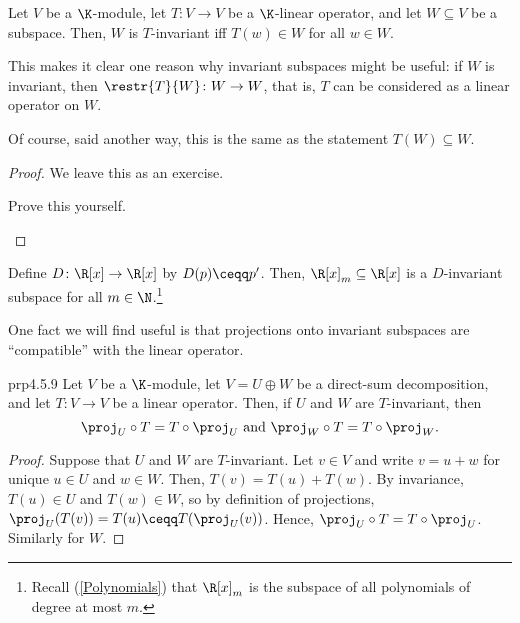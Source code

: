 \begin{prp}{}{}
	Let $V$ be a $\K$-module, let $T\colon V\rightarrow V$ be a $\K$-linear operator, and let $W\subseteq V$ be a subspace.  Then, $W$ is $T$-invariant iff $T(w)\in W$ for all $w\in W$.
	\begin{rmk}
		This makes it clear one reason why invariant subspaces might be useful:  if $W$ is invariant, then $\restr{T}{W}\colon W\rightarrow W$, that is, $T$ can be considered as a linear operator on $W$.
	\end{rmk}
	\begin{rmk}
		Of course, said another way, this is the same as the statement $T(W)\subseteq W$.
	\end{rmk}
	\begin{proof}
		We leave this as an exercise.
		\begin{exr}[breakable=false]{}{}
			Prove this yourself.
		\end{exr}
	\end{proof}
\end{prp}
\begin{exm}{}{}
	Define $D\colon \R [x]\rightarrow \R [x]$ by $D(p)\ceqq p'$.  Then, $\R [x]_m\subseteq \R [x]$ is a $D$-invariant subspace for all $m\in \N$.\footnote{Recall (\cref{Polynomials}) that $\R [x]_m$ is the subspace of all polynomials of degree at most $m$.}
\end{exm}

One fact we will find useful is that projections onto invariant subspaces are ``compatible'' with the linear operator.
\begin{prp}{}{prp4.5.9}
	Let $V$ be a $\K$-module, let $V=U\oplus W$ be a direct-sum decomposition, and let $T\colon V\rightarrow V$ be a linear operator.  Then, if $U$ and $W$ are $T$-invariant, then
	\begin{equation}
		\proj _U\circ T=T\circ \proj _U\text{ and }\proj _W\circ T=T\circ \proj _W.
	\end{equation}
	\begin{proof}
		Suppose that $U$ and $W$ are $T$-invariant.  Let $v\in V$ and write $v=u+w$ for unique $u\in U$ and $w\in W$.  Then, $T(v)=T(u)+T(w)$.  By invariance, $T(u)\in U$ and $T(w)\in W$, so by definition of projections, $\proj _U(T(v))=T(u)\ceqq T(\proj _U(v))$.  Hence, $\proj _U\circ T=T\circ \proj _U$.  Similarly for $W$.
	\end{proof}
\end{prp}

